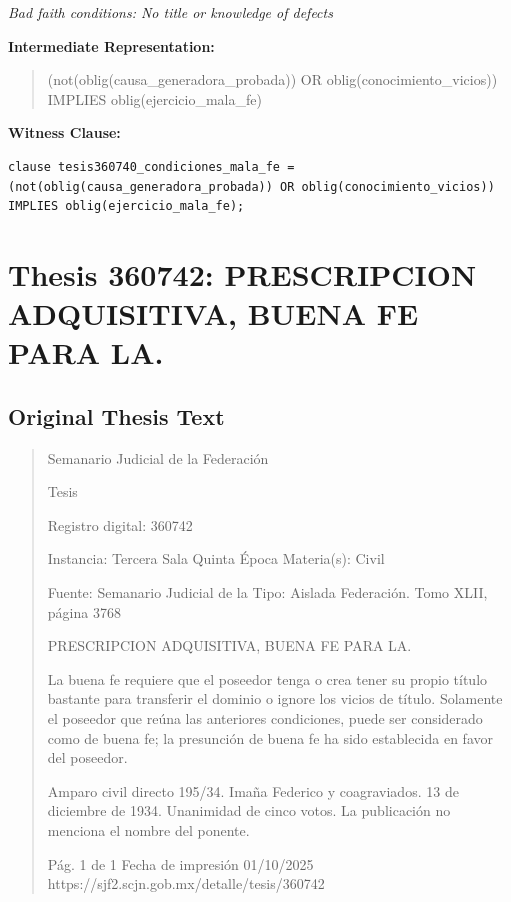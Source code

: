 \documentclass[11pt,a4paper]{article}
\begin{document}
\textit{Bad faith conditions: No title or knowledge of defects}

\textbf{Intermediate Representation:}

\begin{quote}
(not(oblig(causa\_generadora\_probada)) OR oblig(conocimiento\_vicios)) IMPLIES oblig(ejercicio\_mala\_fe)
\end{quote}

\textbf{Witness Clause:}

\begin{lstlisting}[style=witnessstyle, language=Witness]
clause tesis360740_condiciones_mala_fe = (not(oblig(causa_generadora_probada)) OR oblig(conocimiento_vicios)) IMPLIES oblig(ejercicio_mala_fe);
\end{lstlisting}

\newpage

\section{Thesis 360742: PRESCRIPCION ADQUISITIVA, BUENA FE PARA LA.}
\label{thesis:360742}

\subsection{Original Thesis Text}

\begin{quote}
                                                   Semanario Judicial de la Federación

                                                  Tesis

 Registro digital: 360742

 Instancia: Tercera Sala          Quinta Época                         Materia(s): Civil

                                  Fuente: Semanario Judicial de la     Tipo: Aislada
                                  Federación.
                                  Tomo XLII, página 3768


PRESCRIPCION ADQUISITIVA, BUENA FE PARA LA.


La buena fe requiere que el poseedor tenga o crea tener su propio título bastante para transferir el
dominio o ignore los vicios de título. Solamente el poseedor que reúna las anteriores condiciones,
puede ser considerado como de buena fe; la presunción de buena fe ha sido establecida en favor
del poseedor.


Amparo civil directo 195/34. Imaña Federico y coagraviados. 13 de diciembre de 1934. Unanimidad
de cinco votos. La publicación no menciona el nombre del ponente.




                                             Pág. 1 de 1             Fecha de impresión 01/10/2025
  https://sjf2.scjn.gob.mx/detalle/tesis/360742

\end{quote}
\end{document}
